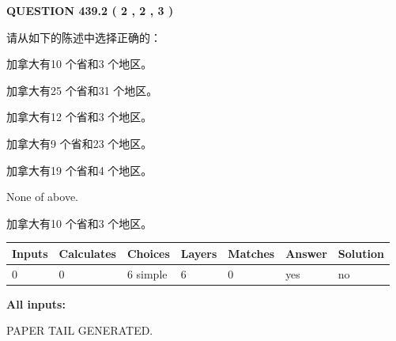 \documentclass{ctexart}
\begin{document}
   
  
\vspace{0.2in}
  
{\textbf{\Large{QUESTION
439.2 
 ( 2 , 2 , 3 )
}}}
  
  
请从如下的陈述中选择正确的：
 
 
加拿大有10 个省和3 个地区。
 
 
加拿大有25 个省和31 个地区。
 
 
加拿大有12 个省和3 个地区。
 
 
加拿大有9 个省和23 个地区。
 
 
加拿大有19 个省和4 个地区。
 
 
 None of above.
 
 
\noindent{}
 
 
加拿大有10 个省和3 个地区。
 
 
\noindent{}
 
 
   
   
   
   
\noindent\begin{tabular}{|l|l|l|l|l|l|l|}
 \hline
Inputs & Calculates & Choices & Layers & Matches & Answer & Solution \\ \hline
 0  & 
 0  & 
 6
  simple  
  & 
 6  & 
 0  & 
  yes & 
  no 
  \\ \hline
 \end{tabular}
   
   
   
   
\noindent{}
   
   
   
   
\noindent\vspace{0.1in}\hspace{-0.08in} {\textbf{\Large{All inputs: }}}
   
   
   
   
   
   
 \vspace{0.2in}
 
   
   
\vspace{2.0in} PAPER TAIL GENERATED.
   
\end{document}
